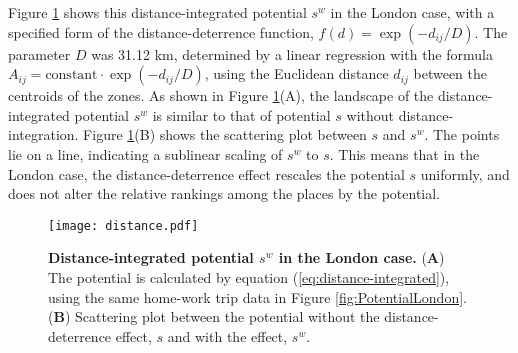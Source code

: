 \documentclass[]{article}
\begin{document}
Figure \ref{fig:distance-integrated-London} shows this distance-integrated potential $s^w$ in the London case, with a specified  form of the distance-deterrence function, $ f(d) = \exp(-d_{ij}/D)$.
The parameter $D$ was 31.12 km, determined by a linear regression with the formula $A_{ij} = \text{constant} \cdot \exp(-d_{ij}/D)$, using the Euclidean distance $d_{ij}$ between the centroids of the zones.
As shown in Figure \ref{fig:distance-integrated-London}(A),
the landscape of the distance-integrated potential $s^w$ is similar to that of potential $s$ without distance-integration.
Figure \ref{fig:distance-integrated-London}(B) shows the scattering plot between $s$ and  $s^w$.
The points lie on a line, indicating a sublinear scaling of $s^w$ to $s$.
This means that in the London case, the distance-deterrence effect rescales the potential $s$ uniformly, and does not alter the relative rankings among the places by the potential.


\begin{figure}[tb]
  \texttt{[image: distance.pdf]}
  \caption{
  \textbf{Distance-integrated potential $s^w$ in the London case.}
    (\textbf{A}) 
    The potential is calculated by equation (\ref{eq:distance-integrated}), using the same 
    home-work trip data in Figure \ref{fig:PotentialLondon}.
    (\textbf{B}) 
    Scattering plot between the potential without the distance-deterrence effect, $s$ and with the effect, $s^w$.
  }
  \label{fig:distance-integrated-London}
\end{figure}
\end{document}
